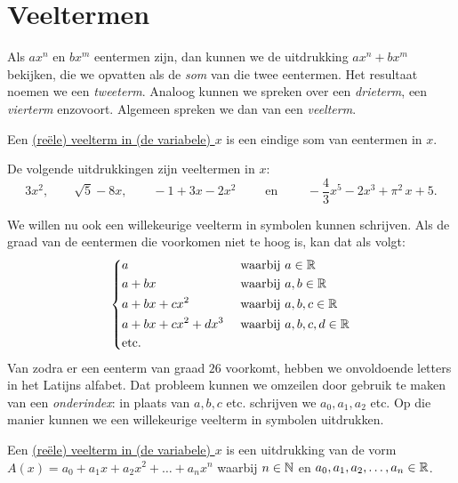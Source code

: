 \documentclass{ximera}
\begin{document}
\author{Koen de Naeghel - Wiskunde Op Maat}



\section{Veeltermen}

Als $ax^n$ en $bx^m$ eentermen zijn, dan kunnen we de uitdrukking $ax^n + bx^m$ bekijken, die we opvatten als de {\em som} van die twee eentermen. Het resultaat noemen we een {\em tweeterm}. Analoog kunnen we spreken over een {\em drieterm}, een {\em vierterm} enzovoort. Algemeen spreken we dan van een {\em veelterm}.

\begin{definition} 
Een \underline{(re\"ele) veelterm in (de variabele) $x$} is een eindige som van eentermen in $x$.
\end{definition} 

\begin{example} 
De volgende uitdrukkingen zijn veeltermen in $x$:
\[
3x^2, \qquad \sqrt{5} - 8x, \qquad -1 + 3x -2x^2 \qquad \text{ en } \qquad -\frac{4}{3}x^5 - 2x^3 + \pi^2\,x + 5. 
\]
\end{example} 

We willen nu ook een willekeurige veelterm in symbolen kunnen schrijven. Als de graad van de eentermen die voorkomen niet te hoog is, kan dat als volgt:
\begin{align*} 
\left\{
\begin{aligned}
& a && \text{ waarbij } a \in \mathbb{R}  \\
& a + bx && \text{ waarbij } a,b \in \mathbb{R}  \\
& a + bx + cx^2 && \text{ waarbij } a,b,c \in \mathbb{R}  \\
& a + bx + cx^2 + dx^3 && \text{ waarbij } a,b,c,d \in \mathbb{R} \\
& \text{etc.} && 
\end{aligned}
\right.
\end{align*}
Van zodra er een eenterm van graad $26$ voorkomt, hebben we onvoldoende letters in het Latijns alfabet. Dat probleem kunnen we omzeilen door gebruik te maken van een {\em onderindex}\:: in plaats van $a,b,c$ etc. schrijven we $a_0, a_1, a_2$ etc. Op die manier kunnen we een willekeurige veelterm in symbolen uitdrukken.

\begin{definition} 
Een \underline{(re\"ele) veelterm in (de variabele) $x$} is een uitdrukking van de vorm $A(x) = a_0 + a_1x + a_2x^2 + \dots + a_n x^n$ waarbij $n \in \mathbb{N}$ en $a_0,a_1,a_2,\ldots,a_n \in \mathbb{R}$.
\end{definition} 
\end{document}
